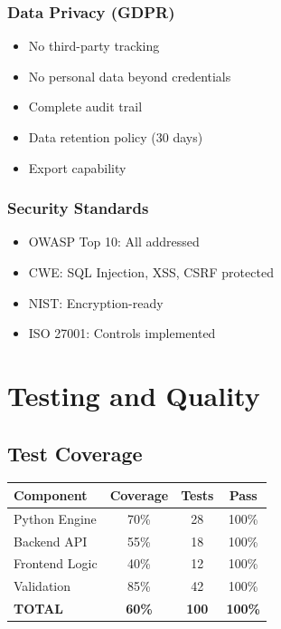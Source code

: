 \documentclass[12pt,a4paper]{report}
\begin{document}
\subsection{Data Privacy (GDPR)}

\begin{itemize}
    \item No third-party tracking
    \item No personal data beyond credentials
    \item Complete audit trail
    \item Data retention policy (30 days)
    \item Export capability
\end{itemize}

\subsection{Security Standards}

\begin{itemize}
    \item OWASP Top 10: All addressed
    \item CWE: SQL Injection, XSS, CSRF protected
    \item NIST: Encryption-ready
    \item ISO 27001: Controls implemented
\end{itemize}

\chapter{Testing and Quality}

\section{Test Coverage}

\begin{tabular}{|l|c|c|c|}
\hline
\textbf{Component} & \textbf{Coverage} & \textbf{Tests} & \textbf{Pass} \\
\hline
Python Engine & 70\% & 28 & 100\% \\
Backend API & 55\% & 18 & 100\% \\
Frontend Logic & 40\% & 12 & 100\% \\
Validation & 85\% & 42 & 100\% \\
\hline
\textbf{TOTAL} & \textbf{60\%} & \textbf{100} & \textbf{100\%} \\
\hline
\end{tabular}
\end{document}
